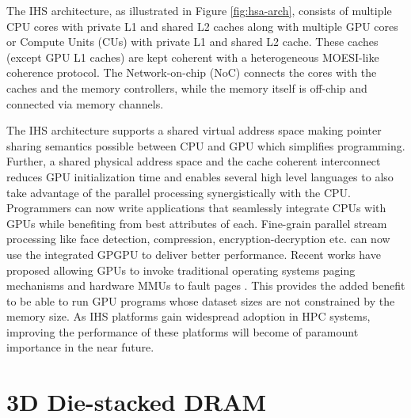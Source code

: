 \par The IHS architecture, as illustrated in Figure \ref{fig:hsa-arch}, consists of multiple CPU cores with private L1 and shared L2 caches along with multiple GPU cores or Compute Units (CUs) with private L1 and shared L2 cache. These caches (except GPU L1 caches) are kept coherent with a heterogeneous MOESI-like coherence protocol. The Network-on-chip (NoC) connects the cores with the caches and the memory controllers, while the memory itself is off-chip and connected via memory channels. 
\par The IHS architecture supports a shared virtual address space making pointer sharing semantics possible between CPU and GPU which simplifies programming. Further, a shared physical address space and the cache coherent interconnect reduces GPU initialization time and enables several high level languages \cite{sumatra,julia} to also take advantage of the parallel processing synergistically with the CPU. Programmers can now write applications that seamlessly integrate CPUs with GPUs while benefiting from best attributes of each. Fine-grain parallel stream processing like face detection, compression, encryption-decryption etc. can now use the integrated GPGPU to deliver better performance. Recent works have proposed allowing GPUs to invoke traditional operating systems paging mechanisms and hardware MMUs to fault pages \cite{tlb-translation}. This provides the added benefit to be able to run GPU programs whose dataset sizes are not constrained by the memory size. As IHS platforms gain widespread adoption in HPC systems, improving the performance of these platforms will become of paramount importance in the near future. \cite{apu-exascale,amd-exascale1}


\section{3D Die-stacked DRAM}

